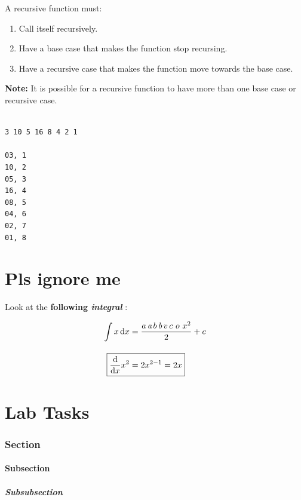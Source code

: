 \documentclass[12pt]{article}
\begin{document}
\noindent A recursive function must:

\begin{enumerate}
    \item Call itself recursively.
    \item Have a base case that makes the function stop recursing.
    \item Have a recursive case that makes the function move towards the base case.
\end{enumerate}

\noindent \textbf{Note:} It is possible for a recursive function to have more than one base case or recursive case. \\

\newpage

\begin{verbatim}

3 10 5 16 8 4 2 1

03, 1
10, 2
05, 3
16, 4
08, 5
04, 6
02, 7
01, 8

\end{verbatim}













\newpage
{}
\part*{Pls ignore me} \label{pls ignore me}

Look at the \textbf{following \textit{integral}} : 

\begin{align*}
    \int x \, \text{d}x &= \frac{ a \, \textit{a} \, b \, \textit{b} \, v\, c \ o \ x^2}{2} + c \\
    \intertext{}
    \Aboxed{\frac{\text{d}}{\text{d}x} x^2 &= 2 x^{2 - 1} = 2x} \\
\end{align*}


\newpage
{}
\part*{Lab Tasks}



\newpage
{}
\section*{Section}


\subsection*{Subsection}

\subsubsection*{Subsubsection}
\end{document}
